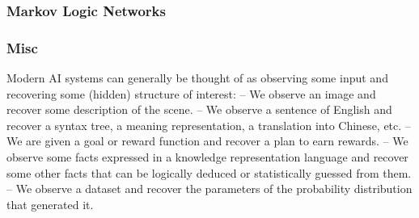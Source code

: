 \documentclass[a4paper,10pt]{article}
\begin{document}
\subsubsection{Markov Logic Networks}

\subsubsection{Misc}
Modern AI systems can generally be thought of as observing some input and recovering some (hidden)
structure of interest:
– We observe an image and recover some description of the scene.
– We observe a sentence of English and recover a syntax tree, a meaning representation, a translation into
Chinese, etc.
– We are given a goal or reward function and recover a plan to earn rewards.
– We observe some facts expressed in a knowledge representation language and recover some other facts
that can be logically deduced or statistically guessed from them.
– We observe a dataset and recover the parameters of the probability distribution that generated it.
\end{document}
